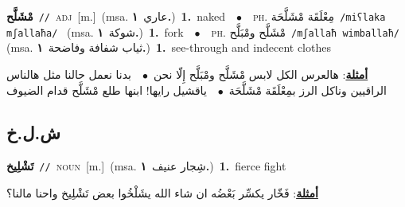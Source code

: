 \documentclass[10pt,a4paper,twoside]{article} %
\begin{document}
\begin{multicols}{2}
{\setlength\topsep{0pt}\textbf{\foreignlanguage{arabic}{مْشَلَّح}}\ {\color{gray}\texttt{//}\color{black}}\ \textsc{adj}\ [m.]\ \color{gray}(msa. \foreignlanguage{arabic}{عاري}~\foreignlanguage{arabic}{\textbf{١.}})\color{black}\ \textbf{1.}~naked\ \ $\bullet$\ \ \textsc{ph.} \color{gray} \foreignlanguage{arabic}{مِعْلَقَة مْشَلَّحَة}\color{black}\ {\color{gray}\texttt{/{\sffamily miʕlaka mʃallaħa}/}\color{black}}\ \color{gray} (msa. \foreignlanguage{arabic}{شوكة}~\foreignlanguage{arabic}{\textbf{١.}})\color{black}\ \textbf{1.}~fork\ \ $\bullet$\ \ \textsc{ph.} \color{gray} \foreignlanguage{arabic}{مْشَلَّح ومْبَلَّح}\color{black}\ {\color{gray}\texttt{/{\sffamily mʃallaħ wimballaħ}/}\color{black}}\ \color{gray} (msa. \foreignlanguage{arabic}{ثياب شفافة وفاضحة}~\foreignlanguage{arabic}{\textbf{١.}})\color{black}\ \textbf{1.}~see-through and indecent clothes\  \begin{flushright}\color{gray}\foreignlanguage{arabic}{\textbf{\underline{\foreignlanguage{arabic}{أمثلة}}}: هالعرس الكل لابس مْشَلَّح ومْبَلَّح إِلّا نحن\ $\bullet$\ \  بدنا نعمل حالنا مثل هالناس الراقيين وناكل الرز بمِعْلَقَة مْشَلَّحَة\ $\bullet$\ \  ياقشيل رايها! ابنها طلع مْشَلَّح قدام الضيوف}\end{flushright}\color{black}} \vspace{2mm}

\vspace{-3mm}
\subsection*{\color{blue}\foreignlanguage{arabic}{ش.ل.خ}\color{blue}{}} 

{\setlength\topsep{0pt}\textbf{\foreignlanguage{arabic}{تَشْلِيخ}}\ {\color{gray}\texttt{//}\color{black}}\ \textsc{noun}\ [m.]\ \color{gray}(msa. \foreignlanguage{arabic}{شِجار عنيف}~\foreignlanguage{arabic}{\textbf{١.}})\color{black}\ \textbf{1.}~fierce fight\  \begin{flushright}\color{gray}\foreignlanguage{arabic}{\textbf{\underline{\foreignlanguage{arabic}{أمثلة}}}: فَخّار يكسِّر بَعْضُه ان شاء الله يشَلْخُوا بعض تَشْلِيخ واحنا مالنا؟}\end{flushright}\color{black}} \vspace{2mm}


\end{multicols}
\end{document}
